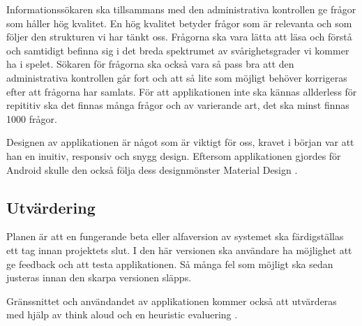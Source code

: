 \documentclass[12pt,a4paper]{article}
\begin{document}
Informationssökaren ska tillsammans med den administrativa kontrollen ge frågor som håller hög kvalitet. En hög kvalitet betyder frågor som är relevanta och som följer den strukturen vi har tänkt oss. Frågorna ska vara lätta att läsa och förstå och samtidigt befinna sig i det breda spektrumet av svårighetsgrader vi kommer ha i spelet. Sökaren för frågorna ska också vara så pass bra att den administrativa kontrollen går fort och att så lite som möjligt behöver korrigeras efter att frågorna har samlats. För att applikationen inte ska kännas allderless för repititiv ska det finnas många frågor och av varierande art, det ska minst finnas 1000 frågor.

Designen av applikationen är något som är viktigt för oss, kravet i början var att han en inuitiv, responsiv och snygg design. Eftersom applikationen gjordes för Android skulle den också följa dess designmönster Material Design \cite{MaterialDesign}.

\subsection{Utvärdering}
Planen är att en fungerande beta eller alfaversion av systemet ska färdigställas ett tag innan projektets slut. I den här versionen ska användare ha möjlighet att ge feedback och att testa applikationen. Så många fel som möjligt ska sedan justeras innan den skarpa versionen släpps.

Gränssnittet och användandet av applikationen kommer också att utvärderas med hjälp av think aloud\cite{thinkaloud} och en heuristic evaluering \cite{heruistic}.

\newpage
\printbibliography[title={Referenser}]
\end{document}
